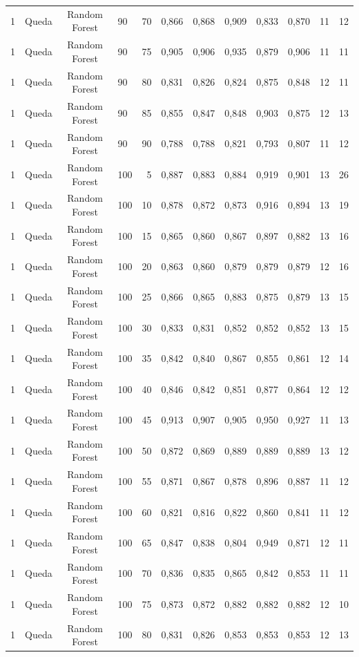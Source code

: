 \begin{longtable}{ccclrrrrrrrr}
1 & Queda & Random Forest & 90 & 70 & 0,866 & 0,868 & 0,909 & 0,833 & 0,870 & 11 & 12 \\
1 & Queda & Random Forest & 90 & 75 & 0,905 & 0,906 & 0,935 & 0,879 & 0,906 & 11 & 11 \\
1 & Queda & Random Forest & 90 & 80 & 0,831 & 0,826 & 0,824 & 0,875 & 0,848 & 12 & 11 \\
1 & Queda & Random Forest & 90 & 85 & 0,855 & 0,847 & 0,848 & 0,903 & 0,875 & 12 & 13 \\
1 & Queda & Random Forest & 90 & 90 & 0,788 & 0,788 & 0,821 & 0,793 & 0,807 & 11 & 12 \\
1 & Queda & Random Forest & 100 & 5 & 0,887 & 0,883 & 0,884 & 0,919 & 0,901 & 13 & 26 \\
1 & Queda & Random Forest & 100 & 10 & 0,878 & 0,872 & 0,873 & 0,916 & 0,894 & 13 & 19 \\
1 & Queda & Random Forest & 100 & 15 & 0,865 & 0,860 & 0,867 & 0,897 & 0,882 & 13 & 16 \\
1 & Queda & Random Forest & 100 & 20 & 0,863 & 0,860 & 0,879 & 0,879 & 0,879 & 12 & 16 \\
1 & Queda & Random Forest & 100 & 25 & 0,866 & 0,865 & 0,883 & 0,875 & 0,879 & 13 & 15 \\
1 & Queda & Random Forest & 100 & 30 & 0,833 & 0,831 & 0,852 & 0,852 & 0,852 & 13 & 15 \\
1 & Queda & Random Forest & 100 & 35 & 0,842 & 0,840 & 0,867 & 0,855 & 0,861 & 12 & 14 \\
1 & Queda & Random Forest & 100 & 40 & 0,846 & 0,842 & 0,851 & 0,877 & 0,864 & 12 & 12 \\
1 & Queda & Random Forest & 100 & 45 & 0,913 & 0,907 & 0,905 & 0,950 & 0,927 & 11 & 13 \\
1 & Queda & Random Forest & 100 & 50 & 0,872 & 0,869 & 0,889 & 0,889 & 0,889 & 13 & 12 \\
1 & Queda & Random Forest & 100 & 55 & 0,871 & 0,867 & 0,878 & 0,896 & 0,887 & 11 & 12 \\
1 & Queda & Random Forest & 100 & 60 & 0,821 & 0,816 & 0,822 & 0,860 & 0,841 & 11 & 12 \\
1 & Queda & Random Forest & 100 & 65 & 0,847 & 0,838 & 0,804 & 0,949 & 0,871 & 12 & 11 \\
1 & Queda & Random Forest & 100 & 70 & 0,836 & 0,835 & 0,865 & 0,842 & 0,853 & 11 & 11 \\
1 & Queda & Random Forest & 100 & 75 & 0,873 & 0,872 & 0,882 & 0,882 & 0,882 & 12 & 10 \\
1 & Queda & Random Forest & 100 & 80 & 0,831 & 0,826 & 0,853 & 0,853 & 0,853 & 12 & 13 \\

\end{longtable}
